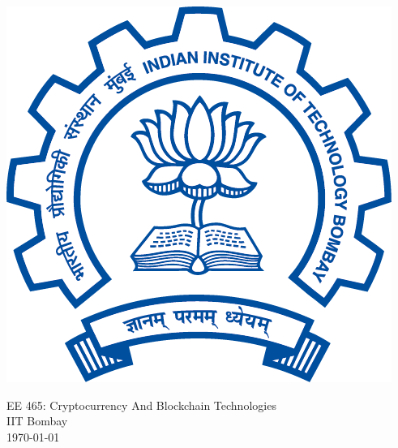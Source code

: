 \begin{titlepage}
\begin{center}
        \includegraphics[width=\titlepageleftcolumnwidth]{figures/logo}
    \end{center}    
  \vspace{1.5cm}
  \begin{center}
  EE 465: Cryptocurrency And Blockchain Technologies \\
  IIT Bombay \\
  \today
  \end{center}
\end{titlepage}
\clearpage